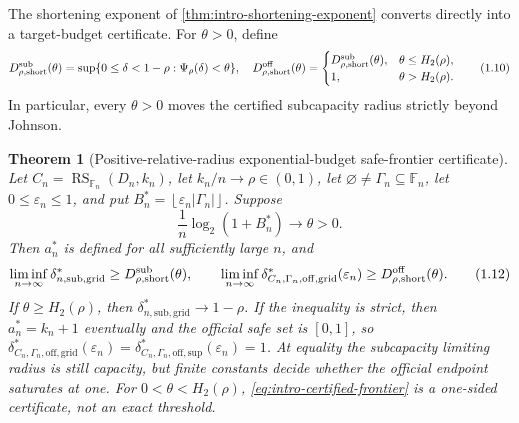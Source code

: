 \documentclass[11pt,a4paper]{amsart}
\numberwithin{equation}{section}
\newtheorem{theorem}{Theorem}[section]
\theoremstyle{remark}
\DeclareMathOperator{\RS}{RS}
\newcommand{\F}{\mathbb F}
\newcommand{\eps}{\varepsilon}
\newcommand{\abs}[1]{\lvert #1\rvert}
\newcommand{\floor}[1]{\left\lfloor #1\right\rfloor}
\begin{document}
The shortening exponent of \cref{thm:intro-shortening-exponent} converts
directly into a target-budget certificate.  For \(\theta>0\), define
\[
 D_{\rho,\mathrm{short}}^{\rm sub}(\theta)
 =\sup\{0\le\delta<1-\rho:\Psi_\rho(\delta)<\theta\},
 \quad
 D_{\rho,\mathrm{short}}^{\rm off}(\theta)=
 \begin{cases}
 D_{\rho,\mathrm{short}}^{\rm sub}(\theta),&
                    \theta\le H_2(\rho),\\
 1,&\theta>H_2(\rho).
 \end{cases}                                      \tag{1.10}
 \label{eq:intro-D-short}
\]
In particular, every \(\theta>0\) moves the certified subcapacity radius
strictly beyond Johnson.

\begin{theorem}[Positive-relative-radius exponential-budget safe-frontier certificate]
\label{thm:intro-exponential-frontier}
Let \(C_n=\RS_{\F_n}(D_n,k_n)\), let \(k_n/n\to\rho\in(0,1)\),
let \(\varnothing\ne\Gamma_n\subseteq\F_n\), let \(0\le\eps_n\le1\), and put
\(B_n^*=\floor{\eps_n\abs{\Gamma_n}}\).  Suppose
\[
 \frac1n\log_2(1+B_n^*)\longrightarrow\theta>0.    \tag{1.11}
 \label{eq:intro-budget-exponent}
\]
Then \(a_n^*\) is defined for all sufficiently large \(n\), and
\[
 \liminf_{n\to\infty}\delta_{n,\mathrm{sub,grid}}^*
 \ge D_{\rho,\mathrm{short}}^{\rm sub}(\theta),\qquad
 \liminf_{n\to\infty}\delta_{C_n,\Gamma_n,\mathrm{off,grid}}^*(\eps_n)
 \ge D_{\rho,\mathrm{short}}^{\rm off}(\theta).  \tag{1.12}
 \label{eq:intro-certified-frontier}
\]
If \(\theta\ge H_2(\rho)\), then
\(\delta_{n,\mathrm{sub,grid}}^*\to1-\rho\).  If the inequality is
strict, then \(a_n^*=k_n+1\) eventually and the official safe set is
\([0,1]\), so
\(\delta_{C_n,\Gamma_n,\mathrm{off,grid}}^*(\eps_n)
=\delta_{C_n,\Gamma_n,\mathrm{off,sup}}^*(\eps_n)=1\).
At equality the subcapacity limiting radius is still capacity, but finite
constants decide whether the official endpoint saturates at one.  For
\(0<\theta<H_2(\rho)\),
\eqref{eq:intro-certified-frontier} is a one-sided certificate, not an
exact threshold.
\end{theorem}
\end{document}
